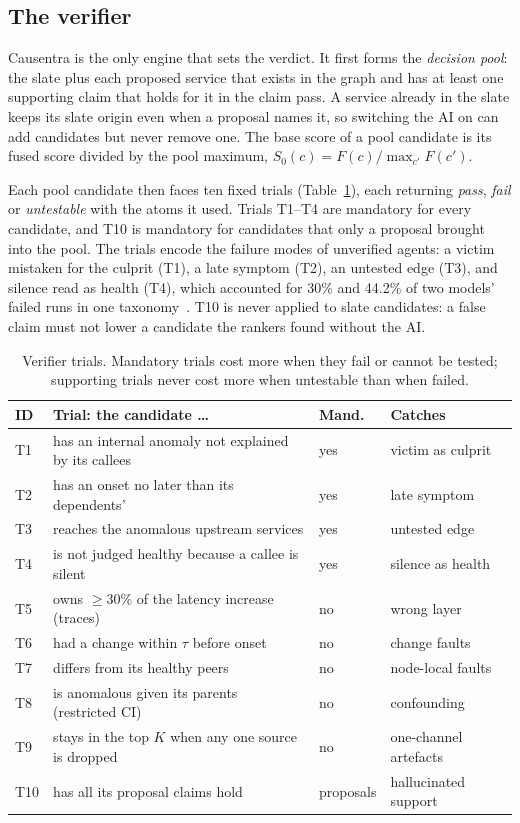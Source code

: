 \subsection{The verifier}
\label{sec:verifier}

Causentra is the only engine that sets the verdict.
It first forms the \emph{decision pool}: the slate plus each proposed service that exists in the graph and has at least one supporting claim that holds for it in the claim pass.
A service already in the slate keeps its slate origin even when a proposal names it, so switching the AI on can add candidates but never remove one.
The base score of a pool candidate is its fused score divided by the pool maximum, $S_0(c) = F(c)/\max_{c'} F(c')$.

Each pool candidate then faces ten fixed trials (Table~\ref{tab:trials}), each returning \emph{pass}, \emph{fail} or \emph{untestable} with the atoms it used.
Trials T1--T4 are mandatory for every candidate, and T10 is mandatory for candidates that only a proposal brought into the pool.
The trials encode the failure modes of unverified agents: a victim mistaken for the culprit (T1), a late symptom (T2), an untested edge (T3), and silence read as health (T4), which accounted for 30\% and 44.2\% of two models' failed runs in one taxonomy~\cite{diagguard2026}.
T10 is never applied to slate candidates: a false claim must not lower a candidate the rankers found without the AI.

\begin{table}[t]
\caption{Verifier trials. Mandatory trials cost more when they fail or cannot be tested; supporting trials never cost more when untestable than when failed.}
\label{tab:trials}
\small
\begin{tabularx}{\linewidth}{@{}lXll@{}}
\toprule
ID & Trial: the candidate \dots & Mand. & Catches \\
\midrule
T1 & has an internal anomaly not explained by its callees & yes & victim as culprit \\
T2 & has an onset no later than its dependents' & yes & late symptom \\
T3 & reaches the anomalous upstream services & yes & untested edge \\
T4 & is not judged healthy because a callee is silent & yes & silence as health \\
T5 & owns $\geq 30\%$ of the latency increase (traces) & no & wrong layer \\
T6 & had a change within $\tau$ before onset & no & change faults \\
T7 & differs from its healthy peers & no & node-local faults \\
T8 & is anomalous given its parents (restricted CI) & no & confounding \\
T9 & stays in the top $K$ when any one source is dropped & no & one-channel artefacts \\
T10 & has all its proposal claims hold & proposals & hallucinated support \\
\bottomrule
\end{tabularx}
\end{table}

